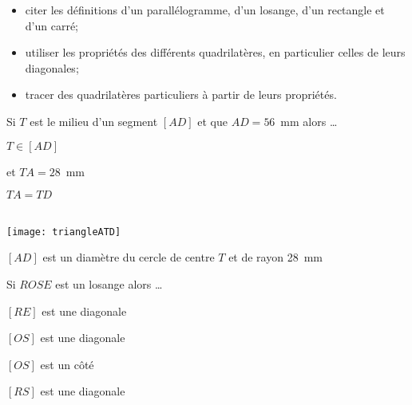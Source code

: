 \begin{acquis} %
\begin{itemize}
\item citer les définitions d'un parallélogramme, d'un losange, d'un rectangle et d'un carré;
\item utiliser les propriétés des différents quadrilatères, en particulier celles de leurs diagonales;
\item tracer des quadrilatères particuliers à partir de leurs propriétés.
\end{itemize}
\end{acquis}


\begin{QCM}
  \begin{GroupeQCM}
    \begin{exercice}
      Si $T$ est le milieu d'un segment $[AD]$ et que $AD = 56$ mm alors \ldots
      \begin{ChoixQCM}{4}
      \item $T \in [AD]$
      
      et $TA = 28$ mm
      \item $TA = TD$
      \item \\[-1em]
      \texttt{[image: triangleATD]}
      \item $[AD]$ est un diamètre du cercle de centre $T$ et de rayon 28 mm
      \end{ChoixQCM}
\begin{corrige}
   \end{corrige}
    \end{exercice}

  \begin{exercice}
      Si $ROSE$ est un losange alors \ldots
      \begin{ChoixQCM}{4}
      \item $[RE]$ est une diagonale
      \item $[OS]$ est une diagonale
      \item $[OS]$ est un côté
      \item $[RS]$ est une diagonale
      \end{ChoixQCM}
\begin{corrige}
   \end{corrige}
    \end{exercice}


\end{GroupeQCM}
\end{QCM}

  
